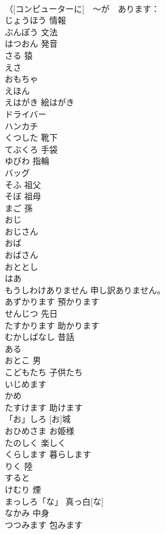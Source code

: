 \documentclass[8pt]{extreport}
\begin{document}
\begin{CJK}{UTF8}{min}
\\	（[コンピューターに]　～が　あります：
\\	じょうほう	情報	
\\	ぶんぽう	文法	
\\	はつおん	発音	
\\	さる	猿	
\\	えさ			
\\	おもちゃ			
\\	えほん			
\\	えはがき	絵はがき	
\\	ドライバー			
\\	ハンカチ			
\\	くつした	靴下	
\\	てぶくろ	手袋	
\\	ゆびわ	指輪	
\\	バッグ			
\\	そふ	祖父	
\\	そぼ	祖母	
\\	まご	孫	
\\	おじ			
\\	おじさん			
\\	おば			
\\	おばさん			
\\	おととし			
\\	はあ			
\\	もうしわけありません	申し訳ありません。	
\\	あずかります	預かります	
\\	せんじつ	先日	
\\	たすかります	助かります	
\\	むかしばなし	昔話	
\\	ある			
\\	おとこ	男	
\\	こどもたち	子供たち	
\\	いじめます			
\\	かめ			
\\	たすけます	助けます	
\\	「お」しろ	[お]城	
\\	おひめさま	お姫様	
\\	たのしく	楽しく	
\\	くらします	暮らします	
\\	りく	陸	
\\	すると			
\\	けむり	煙	
\\	まっしろ「な」	真っ白[な]	
\\	なかみ	中身	
\\	つつみます	包みます	

\end{CJK}
\end{document}
